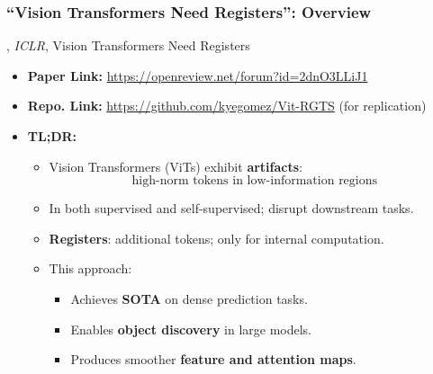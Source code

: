 \documentclass[aspectratio=169]{beamer}
\begin{document}
\frame{\titlepage}%

\begin{frame}
\frametitle{``Vision Transformers Need Registers'': Overview}

\cite{darcetVisionTransformersNeed2024}, \textit{ICLR}, Vision Transformers Need Registers

\vspace{1em}

\begin{itemize}
    \item \textbf{Paper Link:} \href{https://openreview.net/forum?id=2dnO3LLiJ1}{https://openreview.net/forum?id=2dnO3LLiJ1}
    \item \textbf{Repo. Link:} \href{https://github.com/kyegomez/Vit-RGTS}{https://github.com/kyegomez/Vit-RGTS} \quad (for replication)

    \vspace{1em}

    \item \textbf{TL;DR:}
    \begin{itemize}
        \item Vision Transformers (ViTs) exhibit \textbf{artifacts}: 
        $$\boxed{\text{high-norm tokens in low-information regions}}$$
        \item In both supervised and self-supervised; disrupt downstream tasks.
        \item \textbf{Registers}: additional tokens; only for internal computation.
        \item This approach:
        \begin{itemize}
            \item Achieves \textbf{SOTA} on dense prediction tasks.
            \item Enables \textbf{object discovery} in large models.
            \item Produces smoother \textbf{feature and attention maps}.
        \end{itemize}
    \end{itemize}
\end{itemize}
\end{frame}
\end{document}
